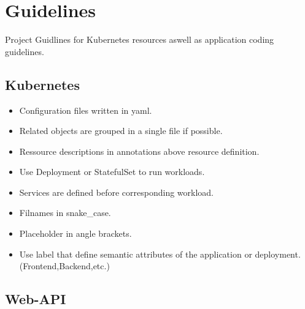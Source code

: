 \chapter{Guidelines}
Project Guidlines for Kubernetes resources aswell as application coding guidelines.

\section{Kubernetes}
\begin{itemize}
    \item Configuration files written in yaml.
    \item Related objects are grouped in a single file if possible.
    \item Ressource descriptions in annotations above resource definition.
    \item Use Deployment or StatefulSet to run workloads.
    \item Services are defined before corresponding workload.
    \item Filnames in snake\_case.
    \item Placeholder in angle brackets.
    \item Use label that define semantic attributes of the application or deployment. (Frontend,Backend,etc.)
\end{itemize}

\section{Web-API}
